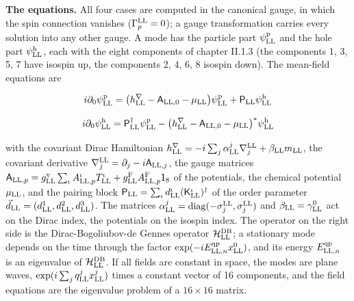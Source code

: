 \documentclass[
  10pt,
]{article}
\begin{document}
\textbf{The equations.} All four cases are computed in the canonical
gauge, in which the spin connection vanishes (\(\Gamma^{\rm LL}_p=0\));
a gauge transformation carries every solution into any other gauge. A
mode has the particle part \(\psi^{\rm p}_{\rm LL}\) and the hole part
\(\psi^{\rm h}_{\rm LL}\), each with the eight components of chapter
II.1.3 (the components 1, 3, 5, 7 have isospin up, the components 2, 4,
6, 8 isospin down). The mean-field equations are

\[i\partial_0\psi^{\rm p}_{\rm LL}=\big(h^\nabla_{\rm LL}-\mathsf A_{{\rm LL},0}-\mu_{\rm LL}\big)\psi^{\rm p}_{\rm LL}+\mathsf P_{\rm LL}\psi^{\rm h}_{\rm LL}\]

\[i\partial_0\psi^{\rm h}_{\rm LL}=\mathsf P_{\rm LL}^\dagger\psi^{\rm p}_{\rm LL}-\big(h^\nabla_{\rm LL}-\mathsf A_{{\rm LL},0}-\mu_{\rm LL}\big)^{*}\psi^{\rm h}_{\rm LL}\]

with the covariant Dirac Hamiltonian
\(h^\nabla_{\rm LL}=-i\sum_j\alpha^j_{\rm LL}\nabla^{\rm LL}_j+\beta_{\rm LL}m_{\rm LL}\),
the covariant derivative
\(\nabla^{\rm LL}_j=\partial_j-i\mathsf A_{{\rm LL},j}\), the gauge
matrices
\(\mathsf A_{{\rm LL},p}=g^{\rm v}_{\rm LL}\sum_\iota A^\iota_{{\rm LL},p}T^\iota_{\rm LL}+g^{\rm F}_{\rm LL}A^{\rm F}_{{\rm LL},p}\mathsf 1_8\)
of the potentials, the chemical potential \(\mu_{\rm LL}\), and the
pairing block
\(\mathsf P_{\rm LL}=\sum_\iota d^\iota_{\rm LL}(\mathsf K^\iota_{\rm LL})^\dagger\)
of the order parameter
\(\vec d_{\rm LL}=(d^1_{\rm LL},d^2_{\rm LL},d^3_{\rm LL})\). The
matrices
\(\alpha^j_{\rm LL}=\mathrm{diag}(-\sigma^{\rm LL}_j,\sigma^{\rm LL}_j)\)
and \(\beta_{\rm LL}=\gamma^0_{\rm LL}\) act on the Dirac index, the
potentials on the isospin index. The operator on the right side is the
Dirac-Bogoliubov-de Gennes operator \(\mathcal H^{\rm DB}_{\rm LL}\); a
stationary mode depends on the time through the factor
\(\exp(-iE^{\rm qp}_{{\rm LL},n}x^0_{\rm LL})\), and its energy
\(E^{\rm qp}_{{\rm LL},n}\) is an eigenvalue of
\(\mathcal H^{\rm DB}_{\rm LL}\). If all fields are constant in space,
the modes are plane waves, \(\exp(i\sum_jq^j_{\rm LL}x^j_{\rm LL})\)
times a constant vector of 16 components, and the field equations are
the eigenvalue problem of a \(16\times16\) matrix.
\end{document}
